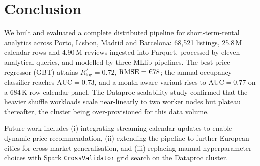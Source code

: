 \documentclass[conference]{IEEEtran}
\begin{document}
\section{Conclusion}

We built and evaluated a complete distributed pipeline for short-term-rental analytics across Porto, Lisbon, Madrid and Barcelona: 68{,}521 listings, 25.8\,M calendar rows and 4.90\,M reviews ingested into Parquet, processed by eleven analytical queries, and modelled by three MLlib pipelines. The best price regressor (GBT) attains $R^2_{\log}=0.72$, $\text{RMSE}=\text{\texteuro}78$; the annual occupancy classifier reaches $\text{AUC}=0.73$, and a month-aware variant rises to $\text{AUC}=0.77$ on a 684\,K-row calendar panel. The Dataproc scalability study confirmed that the heavier shuffle workloads scale near-linearly to two worker nodes but plateau thereafter, the cluster being over-provisioned for this data volume.

Future work includes (i) integrating streaming calendar updates to enable dynamic price recommendation, (ii) extending the pipeline to further European cities for cross-market generalisation, and (iii) replacing manual hyperparameter choices with Spark \texttt{CrossValidator} grid search on the Dataproc cluster.



\end{document}
